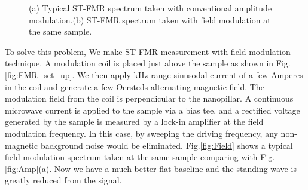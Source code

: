 \begin{figure}[!ht]
\centering
{}
\caption{(a) Typical ST-FMR spectrum taken with conventional amplitude modulation.(b) ST-FMR spectrum taken with field modulation at the same sample.}
\end{figure}





To solve this problem, We make ST-FMR measurement with field modulation technique\cite{FieldMod}. A modulation coil is placed just above the sample as shown in Fig.\ref{fig:FMR_set_up}. We then apply kHz-range sinusodal current of a few Amperes in the coil and generate a few Oersteds alternating magnetic field. The modulation field from the coil is perpendicular to the nanopillar. A continuous microwave current is applied to the sample via a bias tee, and a rectified voltage generated by the sample is measured by a lock-in amplifier at the field modulation frequency. In this case, by sweeping the driving frequency, any non-magnetic background noise would be eliminated. Fig.\ref{fig:Field} shows a typical field-modulation spectrum taken at the same sample comparing with Fig.\ref{fig:Amp}(a). Now we have a much better flat baseline and the standing wave is greatly reduced from the signal.


